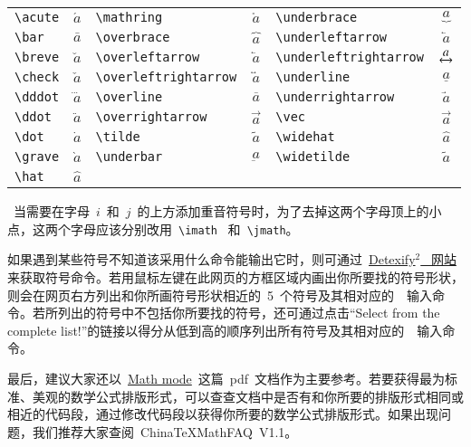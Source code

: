 \vspace{0.5em}\noindent\wuhao\begin{tabularx}{\textwidth}{Xc|Xc|Xc}
 \verb|\acute| & $\acute{a}$ & \verb|\mathring| & $\mathring{a}$ & \verb|\underbrace| & $\underbrace{a}$ \\
 \verb|\bar| & $\bar{a}$ & \verb|\overbrace| & $\overbrace{a}$ & \verb|\underleftarrow| & $\underleftarrow{a}$ \\
 \verb|\breve| & $\breve{a}$ & \verb|\overleftarrow| & $\overleftarrow{a}$ & \verb|\underleftrightarrow| & $\underleftrightarrow{a}$ \\
 \verb|\check| & $\check{a}$ & \verb|\overleftrightarrow| & $\overleftrightarrow{a}$ & \verb|\underline| & $\underline{a}$ \\
 \verb|\dddot| & $\dddot{a}$ & \verb|\overline| & $\overline{a}$ & \verb|\underrightarrow| & $\underrightarrow{a}$ \\
 \verb|\ddot| & $\ddot{a}$ & \verb|\overrightarrow| & $\overrightarrow{a}$ & \verb|\vec| & $\vec{a}$ \\
 \verb|\dot| & $\dot{a}$ & \verb|\tilde| & $\tilde{a}$ & \verb|\widehat| & $\widehat{a}$ \\
 \verb|\grave| & $\grave{a}$ & \verb|\underbar| & $\underbar{a}$ & \verb|\widetilde| & $\widetilde{a}$ \\
 \verb|\hat| & $\hat{a}$
\end{tabularx}\vspace{0.5em}

\xiaosi~当需要在字母~$i$~和~$j$~的上方添加重音符号时，为了去掉这两个字母顶上的小点，这两个字母应该分别改用~\verb|\imath|~ 和~\verb|\jmath|。

如果遇到某些符号不知道该采用什么命令能输出它时，则可通过~\href{http://detexify.kirelabs.org/classify.html}{Detexify$^2$~ 网站}来获取符号命令。若用鼠标左键在此网页的方框区域内画出你所要找的符号形状，则会在网页右方列出和你所画符号形状相近的~5~个符号及其相对应的~\XeLaTeX~输入命令。若所列出的符号中不包括你所要找的符号，还可通过点击“Select from the complete list!”的链接以得分从低到高的顺序列出所有符号及其相对应的~\XeLaTeX~输入命令。

最后，建议大家还以~\href{http://tug.ctan.org/cgi-bin/ctanPackageInformation.py?id=voss-mathmode}{Math mode}~这篇~pdf~文档作为主要参考。若要获得最为标准、美观的数学公式排版形式，可以查查文档中是否有和你所要的排版形式相同或相近的代码段，通过修改代码段以获得你所要的数学公式排版形式。如果出现问题，我们推荐大家查阅~ChinaTeXMathFAQ~V1.1。

